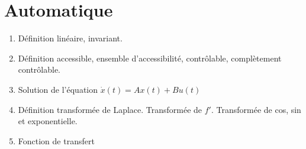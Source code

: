 \documentclass{article}
\begin{document}
\setcounter{tocdepth}{4}
\tableofcontents
\newpage

\part{Automatique}
\begin{enumerate}
\item Définition linéaire, invariant.
\item Définition accessible, ensemble d'accessibilité, contrôlable, complètement contrôlable.
\item Solution de l'équation $\dot{x}(t)=Ax(t)+Bu(t)$
\item Définition transformée de Laplace. Transformée de $f'$. Transformée de cos, sin et exponentielle.
\item Fonction de transfert
\end{enumerate}
\end{document}
